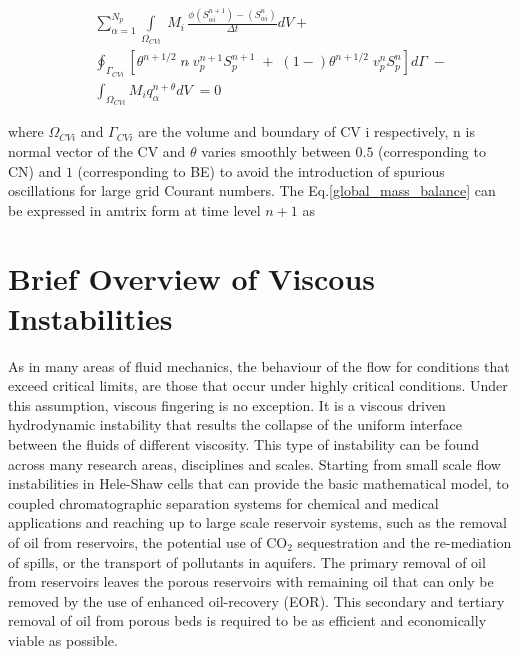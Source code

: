 \documentclass[preprint,authoryear,12pt]{elsarticle}
\begin{document}
\begin{eqnarray}
 && \sum_{\alpha=1}^{N_{p}} \int\limits_{\Omega_{CVi}} \; M_{i} \, \frac{\phi\left(S_{\alpha i}^{n+1}\right)-\left(S_{\alpha i}^{n}\right)}{\Delta t} dV  + \nonumber\\
 &&  \oint_{\Gamma_{CVi}} [\theta^{n+1/2}\; n\dot\;v_{p}^{n+1}S_{p}^{n+1}\;+\;(1-)\theta^{n+1/2}\;v_{p}^{n}S_{p}^{n}] d\Gamma \;- \nonumber\\
 &&  \int_{\Omega_{CVi}} M_{i}q_{\alpha}^{n+\theta}dV\; =0
\label{global_mass_balance}
\end{eqnarray}



where $\Omega_{CVi}$ and $\Gamma_{CVi}$ are the volume and boundary of CV i respectively, n is normal vector of the CV and $\theta$ varies smoothly between $0.5$ (corresponding to CN) and $1$ (corresponding to BE) to avoid the introduction of spurious oscillations for large grid Courant numbers. The Eq.\ref{global_mass_balance} can be expressed in amtrix form at time level $n+1$ as



\section{Brief Overview of Viscous Instabilities}\label{section:ViscousInstabilities}
\medskip
As in many areas of fluid mechanics, the behaviour of the flow for conditions that exceed critical limits, are those that occur under highly critical conditions. Under this assumption, viscous fingering is no exception. It is a viscous driven hydrodynamic instability that results the collapse of the uniform interface between the fluids of different viscosity. This type of instability can be found across many research areas, disciplines and scales. Starting from small scale flow instabilities in Hele-Shaw cells that can provide the basic mathematical model, to coupled chromatographic separation systems for chemical and medical applications and reaching up to large scale reservoir systems,  such as the removal of oil from reservoirs, the potential use of CO$_2$ sequestration and the re-mediation of spills, or the transport of pollutants in aquifers. The primary removal of oil from reservoirs leaves the porous reservoirs with remaining oil that can only be removed by the use of enhanced oil-recovery (EOR). This secondary and tertiary removal of oil from porous beds is required to be as efficient and economically viable as possible.
\end{document}
